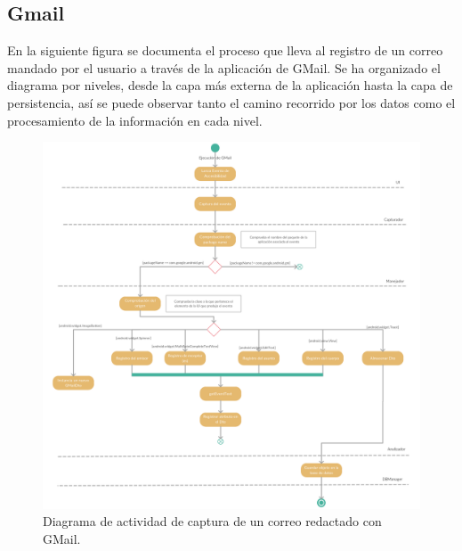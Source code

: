 \documentclass[12pt,a4paper,oneside]{book} %
\begin{document}
\subsection{Gmail}
En la siguiente figura se documenta el proceso que lleva al registro de un correo mandado por el usuario a través de la aplicación de GMail. Se ha organizado el diagrama por niveles, desde la capa más externa de la aplicación hasta la capa de persistencia, así se puede observar tanto el camino recorrido por los datos como el procesamiento de la información en cada nivel.
\begin{landscape}
\begin{figure}[htb]
	\begin{center}
		\includegraphics[width=1.1\textwidth]{pictures/activity/gmailActivityDiagram.png} 
	  \caption[Diagrama actividad GMail]{Diagrama de actividad de captura de un correo redactado con GMail.}
	  \label{fig:Diagrama actividad GMail}
  	\end{center}
\end{figure}
\end{landscape}
\end{document}
